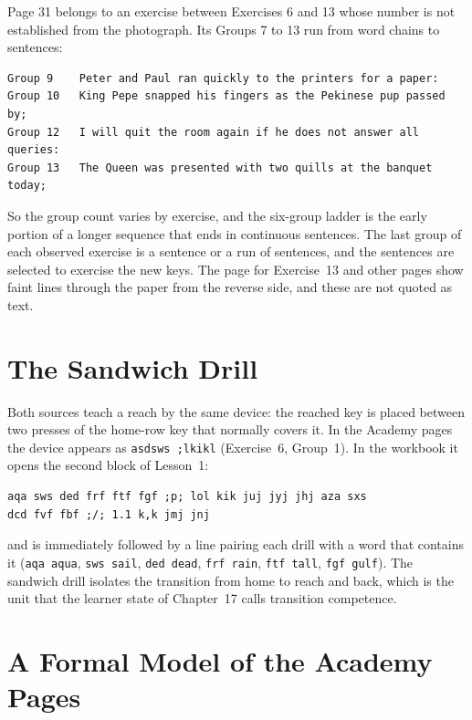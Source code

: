Page 31 belongs to an exercise between Exercises 6 and 13 whose number is not established from the photograph. Its Groups 7 to 13 run from word chains to sentences:

\begin{Verbatim}
Group 9    Peter and Paul ran quickly to the printers for a paper:
Group 10   King Pepe snapped his fingers as the Pekinese pup passed by;
Group 12   I will quit the room again if he does not answer all queries:
Group 13   The Queen was presented with two quills at the banquet today;
\end{Verbatim}

So the group count varies by exercise, and the six-group ladder is the early portion of a longer sequence that ends in continuous sentences. The last group of each observed exercise is a sentence or a run of sentences, and the sentences are selected to exercise the new keys. The page for Exercise~13 and other pages show faint lines through the paper from the reverse side, and these are not quoted as text.

\section{The Sandwich Drill}

Both sources teach a reach by the same device: the reached key is placed between two presses of the home-row key that normally covers it. In the Academy pages the device appears as \texttt{asdsws ;lkikl} (Exercise~6, Group~1). In the workbook it opens the second block of Lesson~1:

\begin{Verbatim}
aqa sws ded frf ftf fgf ;p; lol kik juj jyj jhj aza sxs
dcd fvf fbf ;/; 1.1 k,k jmj jnj
\end{Verbatim}

and is immediately followed by a line pairing each drill with a word that contains it (\texttt{aqa aqua}, \texttt{sws sail}, \texttt{ded dead}, \texttt{frf rain}, \texttt{ftf tall}, \texttt{fgf gulf}). The sandwich drill isolates the transition from home to reach and back, which is the unit that the learner state of Chapter~17 calls transition competence.

\section{A Formal Model of the Academy Pages}

